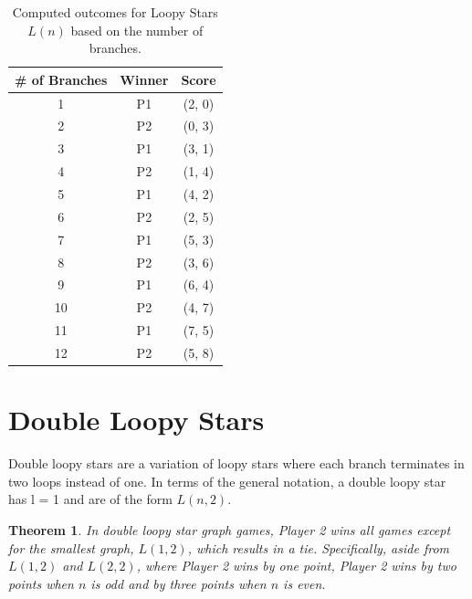 \documentclass{article}
\newtheorem{theorem}{Theorem}
\begin{document}
\begin{table}[hbt!]
\centering
\begin{tabular}{|c|c|c|}
\hline
\textbf{\# of Branches} & \textbf{Winner} & \textbf{Score} \\
\hline
1 & P1 & (2, 0) \\
2 & P2 & (0, 3) \\
3 & P1 & (3, 1) \\
4 & P2 & (1, 4) \\
5 & P1 & (4, 2) \\
6 & P2 & (2, 5) \\
7 & P1 & (5, 3) \\
8 & P2 & (3, 6) \\
9 & P1 & (6, 4) \\
10 & P2 & (4, 7) \\
11 & P1 & (7, 5) \\
12 & P2 & (5, 8) \\
\hline
\end{tabular}
\caption{Computed outcomes for Loopy Stars $L(n)$ based on the number of branches.}
\label{table:hanging-star-outcomes}
\end{table}
\FloatBarrier

\section{Double Loopy Stars}

Double loopy stars are a variation of loopy stars where each branch terminates in two loops instead of one.  In terms of the general notation, a double loopy star has l = 1 and are of the form $L(n,2)$.

\begin{theorem}
In double loopy star graph games, Player 2 wins all games except for the smallest graph, $L(1, 2)$, which results in a tie. Specifically, aside from $L(1, 2)$ and $L(2, 2)$, where Player 2 wins by one point, Player 2 wins by two points when $n$ is odd and by three points when $n$ is even.
\end{theorem}
\end{document}
